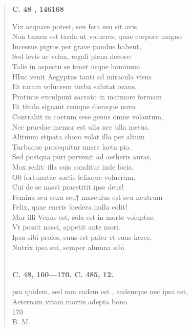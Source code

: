 \documentclass[11pt, a4paper]{report}
\begin{document}
\begin{verse}
    \begin{center} \textbf{C. 48 , 146168} \end{center}Vix aequare potest, seu fera seu sit avis. \\ Non tamen est tarda ut volucres, quae corpore magno \\ Incessus pigros per grave pondus habent, \\ Sed levis ac velox, regali plena decore: \\ Talis in aspectu se tenet usque hominum. \\ HIuc venit Aegyptus tanti ad miracula visus \\ Et raram volucrem turba salutat ovans. \\ Protinus exculpunt sacrato in marmore formam \\ Et titulo signant remque diemque novo. \\ Contrahit in coetum sese genus omne volantum, \\ Nec praedae memor est ulla nec ulla metus. \\ Alituum stipata choro volat illa per altum \\ Turbaque prosequitur unere laeta pio. \\ Sed postqua puri pervenit ad aetheris auras, \\ Mox redit: illa suis conditur inde locis. \\ O0 fortunatae sortis felixque volucrum, \\ Cui de se nasvi praestitit ipse deus! \\ Femina seu  \lbrack sexu seu† masculus est seu neutrum \\ Felix, quae eneris foedera nulla colit! \\ Mor illi Venus est, sola est in morte voluptas: \\ Vt possit nasci, appetit ante mori. \\ Ipsa sibi proles, suus est pater et suus heres, \\ Nutrix ipsa sui, semper alumna sibi. \\ 
        ﻿\pagebreak 
     \marginpar{[28]} \begin{center} \textbf{C. 48, 160—170. C. 485, 12.} \end{center}psa quidem, sed non  \lbrack eadem est \rbrack , eademque nec ipsa est, \\ Aeternam vitam mortis adepta bono. \\ 170 \\ B. M. \\ 
      \end{verse}
  
\end{document}
